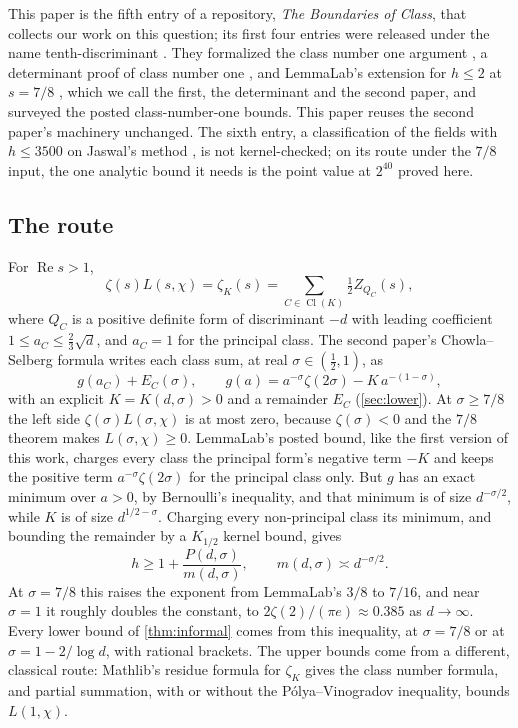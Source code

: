 \documentclass[11pt]{article}
\theoremstyle{definition}
\newcommand{\re}{\operatorname{Re}}
\newcommand{\Cl}{\operatorname{Cl}}
\begin{document}
This paper is the fifth entry of a repository, \emph{The Boundaries of Class}, that collects our work on this question; its first four entries were released under the name tenth-discriminant \cite{TenthDisc}. They formalized the class number one argument \cite{CN1paper}, a determinant proof of class number one \cite{DETpaper}, and LemmaLab's extension for $h \le 2$ at $s = 7/8$ \cite{HCNpaper}, which we call the first, the determinant and the second paper, and surveyed the posted class-number-one bounds. This paper reuses the second paper's machinery unchanged. The sixth entry, a classification of the fields with $h \le 3500$ on Jaswal's method \cite{H3500paper}, is not kernel-checked; on its route under the $7/8$ input, the one analytic bound it needs is the point value at $2^{40}$ proved here.

\subsection{The route}\label{sec:route}

For $\re s > 1$,
\[
\zeta(s)L(s,\chi) = \zeta_K(s) = \sum_{C \in \Cl(K)} \tfrac12 Z_{Q_C}(s),
\]
where $Q_C$ is a positive definite form of discriminant $-d$ with leading coefficient $1 \le a_C \le \frac23\sqrt d$, and $a_C = 1$ for the principal class. The second paper's Chowla--Selberg formula writes each class sum, at real $\sigma \in (\frac12, 1)$, as
\[
g(a_C) + E_C(\sigma), \qquad g(a) = a^{-\sigma}\zeta(2\sigma) - K\,a^{-(1-\sigma)},
\]
with an explicit $K = K(d,\sigma) > 0$ and a remainder $E_C$ (\cref{sec:lower}). At $\sigma \ge 7/8$ the left side $\zeta(\sigma)L(\sigma,\chi)$ is at most zero, because $\zeta(\sigma) < 0$ and the $7/8$ theorem makes $L(\sigma,\chi) \ge 0$. LemmaLab's posted bound, like the first version of this work, charges every class the principal form's negative term $-K$ and keeps the positive term $a^{-\sigma}\zeta(2\sigma)$ for the principal class only. But $g$ has an exact minimum over $a > 0$, by Bernoulli's inequality, and that minimum is of size $d^{-\sigma/2}$, while $K$ is of size $d^{1/2-\sigma}$. Charging every non-principal class its minimum, and bounding the remainder by a $K_{1/2}$ kernel bound, gives
\[
h \ge 1 + \frac{P(d,\sigma)}{m(d,\sigma)}, \qquad m(d,\sigma) \asymp d^{-\sigma/2}.
\]
At $\sigma = 7/8$ this raises the exponent from LemmaLab's $3/8$ to $7/16$, and near $\sigma = 1$ it roughly doubles the constant, to $2\zeta(2)/(\pi e) \approx 0.385$ as $d \to \infty$. Every lower bound of \cref{thm:informal} comes from this inequality, at $\sigma = 7/8$ or at $\sigma = 1 - 2/\log d$, with rational brackets. The upper bounds come from a different, classical route: Mathlib's residue formula for $\zeta_K$ gives the class number formula, and partial summation, with or without the Pólya--Vinogradov inequality, bounds $L(1,\chi)$.
\end{document}
